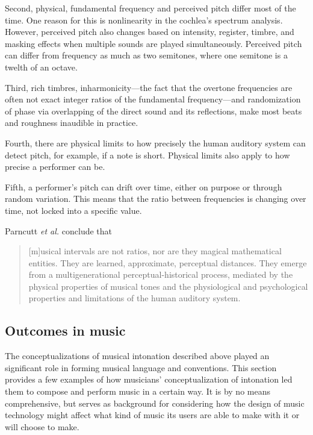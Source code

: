 Second, physical, fundamental frequency and perceived pitch differ most of the time. One reason for this is nonlinearity in the cochlea’s spectrum analysis. However, perceived pitch also changes based on intensity, register, timbre, and masking effects when multiple sounds are played simultaneously. Perceived pitch can differ from frequency as much as two semitones, where one semitone is a twelth of an octave.

Third, rich timbres, inharmonicity---the fact that the overtone frequencies are often not exact integer ratios of the fundamental frequency---and randomization of phase via overlapping of the direct sound and its reflections, make most beats and roughness inaudible in practice.

Fourth, there are physical limits to how precisely the human auditory system can detect pitch, for example, if a note is short. Physical limits also apply to how precise a performer can be.

Fifth, a performer's pitch can drift over time, either on purpose or through random variation. This means that the ratio between frequencies is changing over time, not locked into a specific value.

Parncutt \textit{et al.} conclude that \begin{quotation}[m]usical intervals are not ratios, nor are they magical mathematical entities. They are learned, approximate, perceptual distances. They emerge from a multigenerational perceptual-historical process, mediated by the physical properties of musical tones and the physiological and psychological properties and limitations of the human auditory system.\end{quotation}
 
\subsection{Outcomes in music}
The conceptualizations of musical intonation described above played an significant role in forming musical language and conventions. This section provides a few examples of how musicians' conceptualization of intonation led them to compose and perform music in a certain way. It is by no means comprehensive, but serves as background for considering how the design of music technology might affect what kind of music its users are able to make with it or will choose to make. 

